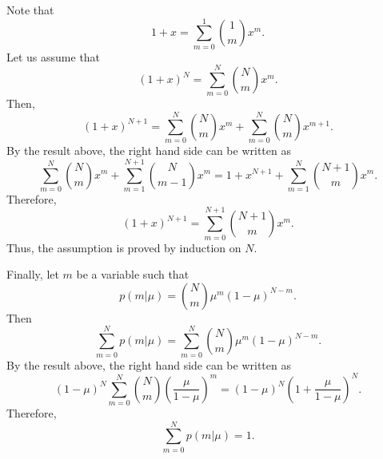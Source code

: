 Note that 
%
\begin{equation}
1 + x 
= 
\sum_{m = 0}^{1} 
{1 \choose m} 
x ^ m.
\end{equation}
%
Let us assume that 
%
\begin{equation}
(1 + x) ^ N 
= 
\sum_{m = 0}^{N} 
{N \choose m} 
x ^ m.
\end{equation}
%
Then,
%
\begin{equation}
(1 + x) ^ {N + 1} 
= 
\sum_{m = 0}^{N} 
{N \choose m} 
x ^ m 
+ 
\sum_{m = 0}^{N} 
{N \choose m} 
x ^ {m + 1}.
\end{equation}
%
By the result above, the right hand side can be written as
%
\begin{equation}
\sum_{m = 0}^{N} 
{N \choose m} 
x ^ m 
+ 
\sum_{m = 1}^{N + 1} 
{N \choose m - 1} 
x ^ m 
= 
1 
+ 
x ^ {N + 1} 
+ 
\sum_{m = 1}^{N} 
{N + 1 \choose m} 
x ^ m.
\end{equation}
%
Therefore,
%
\begin{equation}
(1 + x) ^ {N + 1} 
= 
\sum_{m = 0}^{N + 1} 
{N + 1 \choose m} 
x ^ m.
\end{equation}
%
Thus, the assumption is proved by induction on $N$.

Finally, let $m$ be a variable such that
%
\begin{equation}
p(m | \mu) 
= 
{N \choose m} 
\mu ^ m 
(1 - \mu) ^ {N - m}.
\end{equation}
%
Then
%
\begin{equation}
\sum_{m = 0}^{N} 
p(m | \mu) 
= 
\sum_{m = 0}^{N} 
{N \choose m} 
\mu ^ m 
(1 - \mu) ^ {N - m}.
\end{equation}
%
By the result above, the right hand side can be written as
%
\begin{equation}
(1 - \mu) ^ N 
\sum_{m = 0}^{N} 
{N \choose m} 
\left( 
	\frac{\mu}{1 - \mu} 
\right) ^ m 
= 
(1 - \mu) ^ N 
\left( 
	1 
	+ 
	\frac{\mu}{1 - \mu} 
\right) ^ N.
\end{equation}
%
Therefore,
%
\begin{equation}
\sum_{m = 0}^{N} 
p(m | \mu) 
= 
1.
\end{equation}
%


